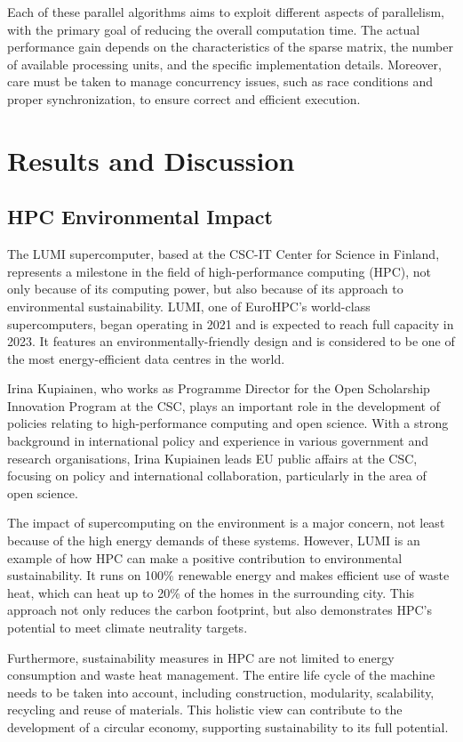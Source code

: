 \documentclass[12pt,oneside]{book} %
\begin{document}
Each of these parallel algorithms aims to exploit different aspects of
parallelism, with the primary goal of reducing the overall computation time.
The actual performance gain depends on the characteristics of the sparse
matrix, the number of available processing units, and the specific
implementation details. Moreover, care must be taken to manage concurrency
issues, such as race conditions and proper synchronization, to ensure correct
and efficient execution.

\newpage

\chapter{Results and Discussion}

\section{HPC Environmental Impact}
The LUMI supercomputer, based at the CSC-IT Center for Science in Finland,
represents a milestone in the field of high-performance computing (HPC), not
only because of its computing power, but also because of its approach to
environmental sustainability. LUMI, one of EuroHPC's world-class
supercomputers, began operating in 2021 and is expected to reach full capacity
in 2023. It features an environmentally-friendly design and is considered to be
one of the most energy-efficient data centres in the world.

Irina Kupiainen, who works as Programme Director for the Open Scholarship
Innovation Program at the CSC, plays an important role in the development of
policies relating to high-performance computing and open science. With a strong
background in international policy and experience in various government and
research organisations, Irina Kupiainen leads EU public affairs at the CSC,
focusing on policy and international collaboration, particularly in the area of
open science.

The impact of supercomputing on the environment is a major concern, not least
because of the high energy demands of these systems. However, LUMI is an
example of how HPC can make a positive contribution to environmental
sustainability. It runs on 100\% renewable energy and makes efficient use of
waste heat, which can heat up to 20\% of the homes in the surrounding city.
This approach not only reduces the carbon footprint, but also demonstrates
HPC's potential to meet climate neutrality targets.

Furthermore, sustainability measures in HPC are not limited to energy
consumption and waste heat management. The entire life cycle of the machine
needs to be taken into account, including construction, modularity,
scalability, recycling and reuse of materials. This holistic view can
contribute to the development of a circular economy, supporting sustainability
to its full potential.
\end{document}
